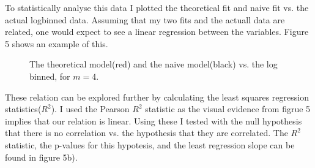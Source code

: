 \documentclass[]{article}
\begin{document}
To statistically analyse this data I plotted the theoretical fit and naive fit vs. the actual logbinned data. Assuming that my two fits and the actuall data are related, one would expect to see a linear regression between the variables. Figure 5 shows an example of this.
\begin{figure}[H]
	 	 	
	 	   		\caption{The theoretical model(red) and the naive model(black) vs. the log binned, for $m=4$.
	 	   			}
\end{figure}
 These relation can be explored further by calculating the least squares regression statistics($R^2$). I used the Pearson $R^2$ statistic as the visual evidence from figrue 5 implies that our relation is linear. Using these I tested with the null hypothesis that there is no correlation vs. the hypothesis that they are correlated. The $R^2$ statistic, the p-values for this hypotesis, and the least regression slope can be found in figure 5b).\\
\end{document}
